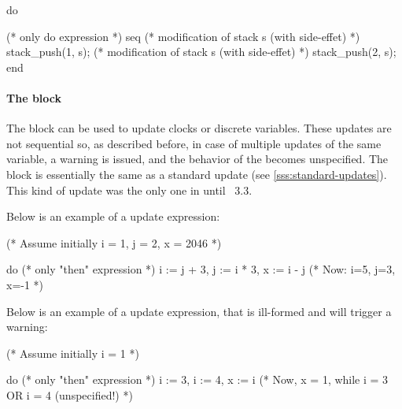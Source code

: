 \begin{IMITATORmodel}
	do {

		(* only do expression *)
		seq
			(* modification of stack s (with side-effet) *)
			stack_push(1, s);
			(* modification of stack s (with side-effet) *)
			stack_push(2, s);
		end

	}
\end{IMITATORmodel}

\paragraph{The  block}

The  block can be used to update clocks or discrete variables.
These updates are not sequential so, as described before, in case of multiple updates of the same variable, a warning is issued, and the behavior of the \NIPTA{} becomes unspecified.
The  block is essentially the same as a standard update (see \cref{sss:standard-updates}).
This kind of update was the only one in \imitator{} until \imitator{}~3.3.

Below is an example of a  update expression:

\begin{IMITATORmodel}
	(* Assume initially i = 1, j = 2, x = 2046 *)

	do {
		(* only "then" expression *)
		i := j + 3,
		j := i * 3,
		x := i - j
	}
	(* Now: i=5, j=3, x=-1 *)
\end{IMITATORmodel}


Below is an example of a  update expression, that is ill-formed and will trigger a warning:

\begin{IMITATORmodel}
	(* Assume initially i = 1 *)

	do {
		(* only "then" expression *)
		i := 3,
		i := 4,
		x := i
	}
	(* Now, x = 1, while i = 3 OR i = 4 (unspecified!) *)
\end{IMITATORmodel}


